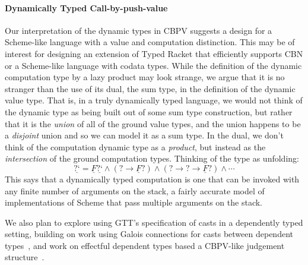 \documentclass[acmsmall,screen,12pt]{acmart}
\newif\iflong
\renewcommand{\u}{\underline}
\newcommand{\dynv}{{?}}
\newcommand{\dync}{\u {\text{?`}}}
\begin{document}
{%

\begin{longonly}
\paragraph{Dynamically Typed Call-by-push-value}

Our interpretation of the dynamic types in CBPV suggests a design for
a Scheme-like language with a value and computation distinction.
%
This may be of interest for designing an extension of Typed Racket that
efficiently supports CBN or a Scheme-like language with codata types.
%
While the definition of the dynamic computation type by a lazy product
may look strange, we argue that it is no stranger than the use of its
dual, the sum type, in the definition of the dynamic value type.
%
That is, in a truly dynamically typed language, we would not think of
the dynamic type as being built out of some sum type construction, but
rather that it is the \emph{union} of all of the ground value types, and the
union happens to be a \emph{disjoint} union and so we can 
model it as a sum type.
%
In the dual, we don't think of the computation dynamic type as a
\emph{product}, but instead as the \emph{intersection} of the ground
computation types.
%
Thinking of the type as unfolding:
\[ \dync = \u F\dync \wedge (\dynv \to \u F \dynv) \wedge (\dynv \to \dynv \to \u F \dynv) \wedge \cdots \]
%
This says that a dynamically typed computation is one that can be
invoked with any finite number of arguments on the stack, a fairly
accurate model of implementations of Scheme that pass multiple
arguments on the stack.
\end{longonly}

\iflong
\paragraph{Dependent Contract Checking}
\fi

We also plan to explore using GTT's specification of casts in a
dependently typed setting, building on work using
Galois connections for casts between dependent
types~\cite{dagand+18interoperability}, and work on effectful dependent
types based a CBPV-like judgement
structure~\cite{ahman+16fiberedeffects}.

}
\end{document}
